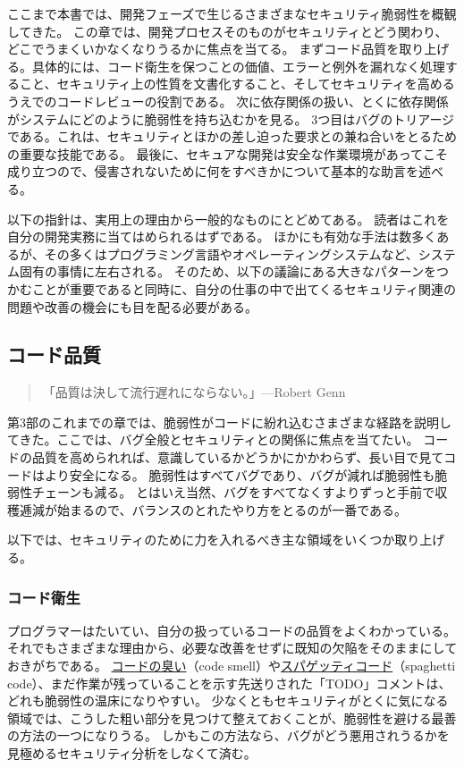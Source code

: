 \documentclass[uplatex]{jsarticle}
\begin{document}
ここまで本書では、開発フェーズで生じるさまざまなセキュリティ脆弱性を概観してきた。
この章では、開発プロセスそのものがセキュリティとどう関わり、どこでうまくいかなくなりうるかに焦点を当てる。
まずコード品質を取り上げる。具体的には、コード衛生を保つことの価値、エラーと例外を漏れなく処理すること、セキュリティ上の性質を文書化すること、そしてセキュリティを高めるうえでのコードレビューの役割である。
次に依存関係の扱い、とくに依存関係がシステムにどのように脆弱性を持ち込むかを見る。
3つ目はバグのトリアージである。これは、セキュリティとほかの差し迫った要求との兼ね合いをとるための重要な技能である。
最後に、セキュアな開発は安全な作業環境があってこそ成り立つので、侵害されないために何をすべきかについて基本的な助言を述べる。

以下の指針は、実用上の理由から一般的なものにとどめてある。
読者はこれを自分の開発実務に当てはめられるはずである。
ほかにも有効な手法は数多くあるが、その多くはプログラミング言語やオペレーティングシステムなど、システム固有の事情に左右される。
そのため、以下の議論にある大きなパターンをつかむことが重要であると同時に、自分の仕事の中で出てくるセキュリティ関連の問題や改善の機会にも目を配る必要がある。

\subsection{コード品質}

\begin{quote}
「品質は決して流行遅れにならない。」---Robert Genn
\end{quote}

第3部のこれまでの章では、脆弱性がコードに紛れ込むさまざまな経路を説明してきた。ここでは、バグ全般とセキュリティとの関係に焦点を当てたい。
コードの品質を高められれば、意識しているかどうかにかかわらず、長い目で見てコードはより安全になる。
脆弱性はすべてバグであり、バグが減れば脆弱性も脆弱性チェーンも減る。
とはいえ当然、バグをすべてなくすよりずっと手前で収穫逓減が始まるので、バランスのとれたやり方をとるのが一番である。

以下では、セキュリティのために力を入れるべき主な領域をいくつか取り上げる。

\subsubsection{コード衛生}

プログラマーはたいてい、自分の扱っているコードの品質をよくわかっている。それでもさまざまな理由から、必要な改善をせずに既知の欠陥をそのままにしておきがちである。
\underline{コードの臭い}（code smell）や\underline{スパゲッティコード}（spaghetti code）、まだ作業が残っていることを示す先送りされた「TODO」コメントは、どれも脆弱性の温床になりやすい。
少なくともセキュリティがとくに気になる領域では、こうした粗い部分を見つけて整えておくことが、脆弱性を避ける最善の方法の一つになりうる。
しかもこの方法なら、バグがどう悪用されうるかを見極めるセキュリティ分析をしなくて済む。
\end{document}

